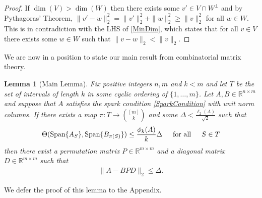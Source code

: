 \documentclass[journal, onecolumn]{IEEEtran}
\newtheorem{lemma}{Lemma}
\begin{document}
\begin{proof}
If $\dim(V) > \dim(W)$ then there exists some $v' \in V \cap W^\perp$ and by Pythagoras' Theorem, $\|v' - w\|_2^2 = \|v'\|_2^2 + \|w\|_2^2 \geq \|v\|_2^2$ for all $w \in W$. This is in contradiction with the LHS of \eqref{MinDim}, which states that for all $v \in V$ there exists some $w \in W$ such that $\|v - w\|_2 < \|v\|_2$.
\end{proof}

We are now in a position to state our main result from combinatorial matrix theory.


\begin{lemma}[Main Lemma]\label{MainLemma}
Fix positive integers $n, m$ and $k < m$ and let $T$ be the set of intervals of length $k$ in some cyclic ordering of $\{1, \ldots, m\}$. Let $A, B \in \mathbb{R}^{n \times m}$ and suppose that $A$ satisfies the spark condition \eqref{SparkCondition} with unit norm columns.  If there exists a map $\pi: T \to {[m] \choose k}$ and some $\Delta < \frac{\ell_{2}(A)}{\sqrt{2}}$ such that 
\begin{equation}\label{GapUpperBound}
\Theta(\text{Span}\{A_{S}\}, \text{Span}\{B_{\pi(S)}\}) \leq \frac{ \phi_k(A) }{k} \Delta \indent \text{for all} \indent S \in T
\end{equation}
%
then there exist a permutation matrix $P \in \mathbb{R}^{m \times m}$ and a diagonal matrix $D \in \mathbb{R}^{m \times m}$ such that
\begin{align}
\|A - BPD\|_2 \leq \Delta.
\end{align}
\end{lemma}

We defer the proof of this lemma to the Appendix. 

\end{document}
